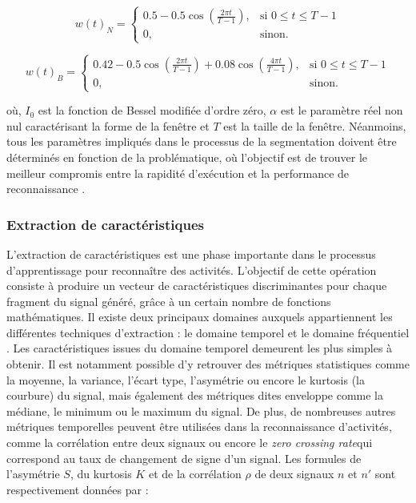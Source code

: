 \begin{equation}
	\label{eq:hann}
	w\left(t\right)_N = \left\{
	\begin{array}{ll}
		0.5-0.5\cos(\frac{2\pi t}{T-1}), & \mbox{si } 0 \leq t \leq T-1 \\
		0, & \mbox{sinon.}
	\end{array}
	\right.
\end{equation}

\begin{equation}
	\label{eq:blackman}
	w\left(t\right)_B = \left\{
	\begin{array}{ll}
		0.42-0.5\cos(\frac{2\pi t}{T-1}) + 0.08\cos(\frac{4\pi t}{T-1}), & \mbox{si } 0 \leq t \leq T-1 \\
		0,                                    & \mbox{sinon.}
	\end{array}
	\right.
\end{equation}

\noindent où, $I_0 $ est la fonction de Bessel modifiée d’ordre zéro, $\alpha$ est le paramètre réel non nul caractérisant la forme de la fenêtre et $T$ est la taille de la fenêtre. Néanmoins, tous les paramètres impliqués dans le processus de la segmentation doivent être déterminés en fonction de la problématique, où l'objectif est de trouver le meilleur compromis entre la rapidité d'exécution et la performance de reconnaissance \citep{Banos2014}.

\subsubsection{Extraction de caractéristiques}

L'extraction de caractéristiques est une phase importante dans le processus d'apprentissage pour reconnaître des activités. L'objectif de cette opération consiste à produire un vecteur de caractéristiques discriminantes pour chaque fragment du signal généré, grâce à un certain nombre de fonctions mathématiques. Il existe deux principaux domaines auxquels appartiennent les différentes techniques d'extraction : le domaine temporel et le domaine fréquentiel \citep{Huynh2005, Figo2010, Cleland2013a}. Les caractéristiques issues du domaine temporel demeurent les plus simples à obtenir. Il est notamment possible d'y retrouver des métriques statistiques comme la moyenne, la variance, l'écart type, l'asymétrie ou encore le kurtosis (la courbure) du signal, mais également des métriques dites \og enveloppe \fg comme la médiane, le minimum ou le maximum du signal. De plus, de nombreuses autres métriques temporelles peuvent être utilisées dans la reconnaissance d'activités, comme la corrélation entre deux signaux ou encore le \textit{zero crossing rate}\textemdash qui correspond au taux de changement de signe d'un signal. Les formules de l'asymétrie $S$, du kurtosis $K$ et de la corrélation $\rho$ de deux signaux $n \mbox{ et } n'$ sont respectivement données par :

